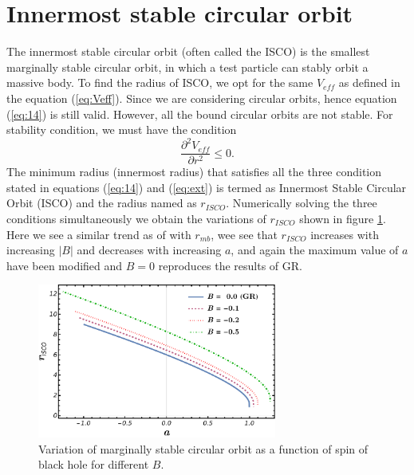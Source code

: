 \documentclass[12pt,a4paper,oneside]{book}
\newcommand{\eq}[2]{\begin{equation} \label{eq:#1} #2 \end{equation}}
\newcommand{\Eref}[1]{(\ref{eq:#1})}
\begin{document}
\section{Innermost stable circular orbit}
The innermost stable circular orbit (often called the ISCO) is the smallest marginally stable circular orbit, in which a test particle can stably orbit a massive body. To find the radius of ISCO, we opt for the same $V_{eff}$ as defined in the equation \Eref{Veff}. Since we are considering circular orbits, hence equation \Eref{14} is still valid. However, all the bound circular orbits are not stable. For stability condition, we must have the condition
\eq{ext}{\frac{{\partial }^2V_{eff}}{\partial r^2}\le 0.} 
The minimum radius (innermost radius) that satisfies all the three condition stated in equations \Eref{14} and \Eref{ext} is termed as Innermost Stable Circular Orbit (ISCO) and the radius named as $r_{ISCO}$. Numerically solving the three conditions simultaneously we obtain the variations of $r_{ISCO}$ shown in figure  \ref{r_ISCO_r_Vs_a}. Here we see a similar trend as of with $r_{mb}$, wee see that $r_{ISCO}$ increases with increasing $|B|$ and decreases with increasing $a$, and again the maximum value of $a$ have been modified and $B=0$ reproduces the results of GR.

\begin{figure}[H]
\centering
    \includegraphics[width=0.7\textwidth]{r_ISCO_r_Vs_a.pdf}
    \caption{\centering Variation of marginally stable circular orbit as a function of spin of black hole for 
	different $B$.}
    \label{r_ISCO_r_Vs_a}
\end{figure}


\end{document}
